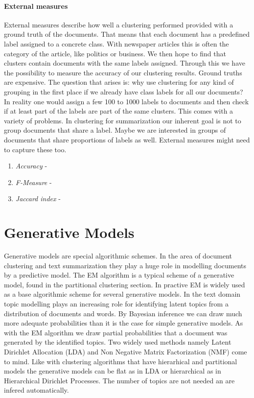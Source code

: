     \paragraph{External measures}
      External measures describe how well a clustering performed provided with a ground truth of the documents. That means that each document has a predefined label assigned to a concrete class. With newspaper articles this is often the category of the article, like politics or business. We then hope to find that clusters contain documents with the same labels assigned. Through this we have the possibility to measure the accuracy of our clustering results. Ground truths are expensive. The question that arises is: why use clustering for any kind of grouping in the first place if we already have class labels for all our documents? In reality one would assign a few 100 to 1000 labels to documents and then check if at least part of the labels are part of the same clusters. This comes with a variety of problems. In clustering for summarization our inherent goal is not to group documents that share a label. Maybe we are interested in groups of documents that share proportions of labels as well. External measures might need to capture these too.

      \begin{enumerate}
        \item \emph{Accuracy} - \cite{Nothing}
        \item \emph{F-Measure} - \cite{Nothing}
        \item \emph{Jaccard index} - \cite{Nothing}
      \end{enumerate}

\section{Generative Models}    

  Generative models are special algorithmic schemes. In the area of document clustering and text summarization they play a huge role in modelling documents by a predictive model.
  The EM algorithm is a typical scheme of a generative model, found in the partitional clustering section. In practive EM is widely used as a base algorithmic scheme for several generative models. In the text domain topic modelling plays an increasing role for identifying latent topics from a distribution of documents and words. By Bayesian inference we can draw much more adequate probabilities than it is the case for simple generative models. As with the EM algorithm we draw partial probabilities that a document was generated by the identified topics. Two widely used methods namely Latent Dirichlet Allocation (LDA) and Non Negative Matrix Factorization (NMF) come to mind. Like with clustering algorithms that have hierarhical and partitional models the generative models can be flat as in LDA or hierarchical as in Hierarchical Dirichlet Processes. The number of topics are not needed an are infered automatically.

